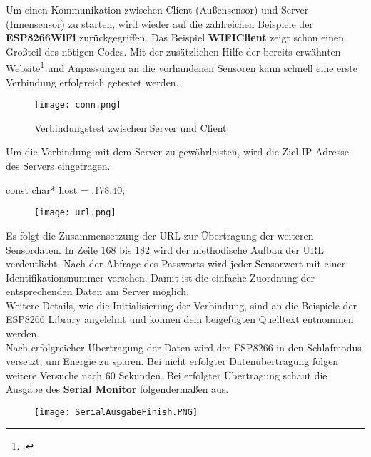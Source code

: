\documentclass[12pt,a4paper]{scrartcl}	%
\begin{document}
Um einen Kommunikation zwischen Client (Außensensor) und Server (Innensensor) zu starten, wird wieder auf die zahlreichen Beispiele der \textbf{ESP8266WiFi} zurückgegriffen. Das Beispiel \textbf{WIFIClient} zeigt schon einen Großteil des nötigen Codes. Mit der zusätzlichen Hilfe der bereits erwähnten Website\footcite[vgl.][Abruf am 27.07.2018]{node} und Anpassungen an die vorhandenen Sensoren kann schnell eine erste Verbindung erfolgreich getestet werden.
\begin{figure}[htb]
	\centering
	\texttt{[image: conn.png]}
	\caption{Verbindungstest zwischen Server und Client}
\end{figure}
Um die Verbindung mit dem Server zu gewährleisten, wird die Ziel IP Adresse des Servers eingetragen.
\begin{center}
	const char* host = .178.40\grqq;
\end{center}
\begin{figure}[htb]
	\texttt{[image: url.png]}
\end{figure}
Es folgt die Zusammensetzung der URL zur Übertragung der weiteren Sensordaten.
In Zeile 168 bis 182 wird der methodische Aufbau der URL verdeutlicht. Nach der Abfrage des Passworts wird jeder Sensorwert mit einer Identifikationsnummer versehen. Damit ist die einfache Zuordnung der entsprechenden Daten am Server möglich.\\
 Weitere Details, wie die Initialisierung der Verbindung, sind an die Beispiele der ESP8266 Library angelehnt und können dem beigefügten Quelltext entnommen werden. \\
Nach erfolgreicher Übertragung der Daten wird der ESP8266 in den Schlafmodus versetzt, um Energie zu sparen. Bei nicht erfolgter Datenübertragung folgen weitere Versuche nach 60 Sekunden.
Bei erfolgter Übertragung schaut die Ausgabe des \textbf{Serial Monitor} folgendermaßen aus.
\begin{figure}[htb]
	\texttt{[image: SerialAusgabeFinish.PNG]}
\end{figure}
\end{document}
